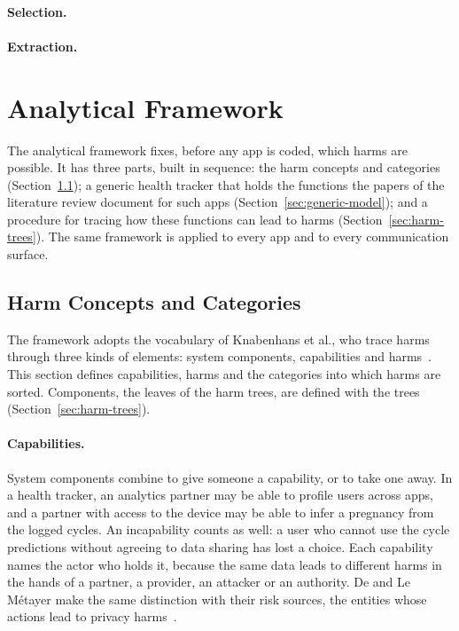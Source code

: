 \paragraph{Selection.} 

\paragraph{Extraction.}


\section{Analytical Framework}
\label{sec:framework}
The analytical framework fixes, before any app is coded, which harms are possible. It has
three parts, built in sequence: the harm concepts and categories
(Section~\ref{sec:harm-categories}); a generic health tracker that holds the functions the
papers of the literature review document for such apps (Section~\ref{sec:generic-model}); and a procedure for
tracing how these functions can lead to harms (Section~\ref{sec:harm-trees}). The same framework
is applied to every app and to every communication surface.

\subsection{Harm Concepts and Categories}
\label{sec:harm-categories}
The framework adopts the vocabulary of Knabenhans et al., who trace harms through three kinds
of elements: system components, capabilities and
harms~\parencite[\S4.1]{knabenhans2026harms}. This section defines capabilities, harms and the
categories into which harms are sorted. Components, the leaves of the harm trees, are defined
with the trees (Section~\ref{sec:harm-trees}).

\paragraph{Capabilities.} System components combine to give someone a capability, or
to take one away. In a health tracker,
an analytics partner may be able to profile users across apps, and a partner
with access to the device may be able to infer a pregnancy from the logged
cycles. An incapability counts as well: a user who cannot use the cycle
predictions without agreeing to data sharing has lost a choice. Each
capability names the actor who holds it, because the same data leads to
different harms in the hands of a partner, a provider, an attacker or an
authority. De and Le Métayer make the same distinction with their risk
sources, the entities whose actions lead to privacy
harms~\parencite{de2016privacy,knabenhans2026harms}.

